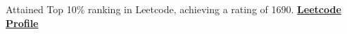 \item{Attained Top 10\% ranking in Leetcode, achieving a rating of 1690.}
{\href{https://leetcode.com/sumedhbhat01/}{\textbf{Leetcode Profile}}}
